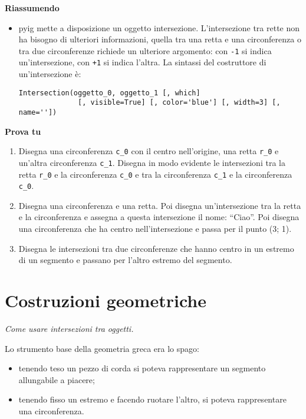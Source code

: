 \textbf{Riassumendo}
\begin{itemize} [noitemsep]
\item pyig mette a disposizione un oggetto intersezione. L'intersezione tra 
rette non ha bisogno di ulteriori informazioni, quella tra una retta e una
circonferenza o tra due circonferenze richiede un ulteriore argomento:
con \texttt{-1} si indica un'intersezione, con \texttt{+1} si indica l'altra.
La sintassi del costruttore di un'intersezione è:

\begin{lstlisting}
Intersection(oggetto_0, oggetto_1 [, which] 
              [, visible=True] [, color='blue'] [, width=3] [, name=''])
\end{lstlisting}

\end{itemize}

\textbf{Prova tu}
\begin{enumerate} [noitemsep]
\item Disegna una circonferenza \texttt{c\_0} con il centro nell'origine,
una retta \texttt{r\_0} e un'altra circonferenza \texttt{c\_1}.
Disegna in modo evidente le intersezioni tra la retta \texttt{r\_0} e la
circonferenza \texttt{c\_0} e tra la circonferenza \texttt{c\_1} e la
circonferenza \texttt{c\_0}.

\item Disegna una circonferenza e una retta. Poi disegna un'intersezione tra
la retta e la circonferenza e assegna a questa intersezione il nome:
``Ciao''. Poi disegna una circonferenza che ha centro nell'intersezione
e passa per il punto (3; 1).

\item Disegna le intersezioni tra due circonferenze che hanno centro in un 
estremo di un segmento e passano per l'altro estremo del segmento.

\end{enumerate}


\section{Costruzioni geometriche}
\label{sec:costruzioni}

\emph{Come usare intersezioni tra oggetti.}

Lo strumento base della geometria greca era lo spago:

\begin{itemize} [noitemsep]
\item tenendo teso un pezzo di corda si poteva rappresentare un segmento
allungabile a piacere;
\item tenendo fisso un estremo e facendo ruotare l'altro, si poteva 
rappresentare una circonferenza.
\end{itemize}

